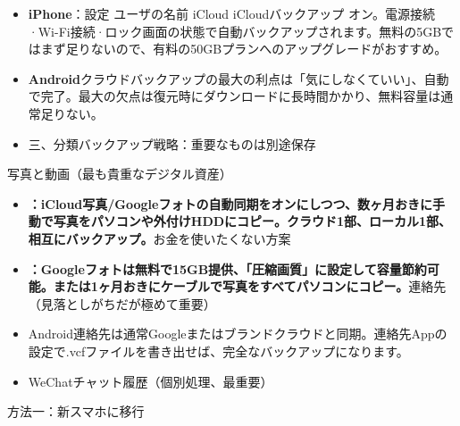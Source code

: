 \begin{itemize}
  \item \textbf{iPhone}：設定 ユーザの名前 iCloud iCloudバックアップ オン。電源接続·Wi-Fi接続·ロック画面の状態で自動バックアップされます。無料の5GBではまず足りないので、有料の50GBプランへのアップグレードがおすすめ。
  \item \textbf{Android}クラウドバックアップの最大の利点は「気にしなくていい」、自動で完了。最大の欠点は復元時にダウンロードに長時間かかり、無料容量は通常足りない。
  \item 三、分類バックアップ戦略：重要なものは別途保存
\end{itemize}


写真と動画（最も貴重なデジタル資産）


\begin{itemize}
  \item \textbf{：iCloud写真/Googleフォトの自動同期をオンにしつつ、数ヶ月おきに手動で写真をパソコンや外付けHDDにコピー。クラウド1部、ローカル1部、相互にバックアップ。}お金を使いたくない方案
  \item \textbf{：Googleフォトは無料で15GB提供、「圧縮画質」に設定して容量節約可能。または1ヶ月おきにケーブルで写真をすべてパソコンにコピー。}連絡先（見落としがちだが極めて重要）
\end{itemize}


\begin{itemize}
  \item Android連絡先は通常Googleまたはブランドクラウドと同期。連絡先Appの設定で.vcfファイルを書き出せば、完全なバックアップになります。
  \item WeChatチャット履歴（個別処理、最重要）
\end{itemize}


方法一：新スマホに移行

